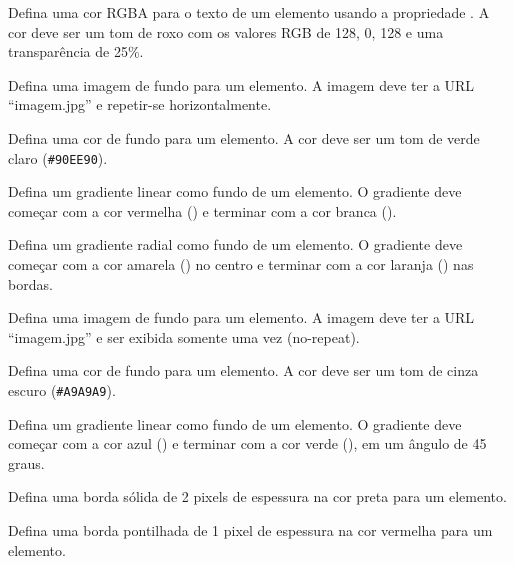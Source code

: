 \begin{exercise}
Defina uma cor RGBA para o texto de um elemento usando a propriedade . A cor deve ser um tom de roxo com os valores RGB de 128, 0, 128 e uma transparência de 25\%.
\end{exercise}

\begin{exercise}
Defina uma imagem de fundo para um elemento. A imagem deve ter a URL ``imagem.jpg'' e repetir-se horizontalmente.
\end{exercise}

\begin{exercise}
Defina uma cor de fundo para um elemento. A cor deve ser um tom de verde claro (\texttt{\#90EE90}).
\end{exercise}

\begin{exercise}
Defina um gradiente linear como fundo de um elemento. O gradiente deve começar com a cor vermelha () e terminar com a cor branca ().
\end{exercise}

\begin{exercise}
Defina um gradiente radial como fundo de um elemento. O gradiente deve começar com a cor amarela () no centro e terminar com a cor laranja () nas bordas.
\end{exercise}

\begin{exercise}
Defina uma imagem de fundo para um elemento. A imagem deve ter a URL ``imagem.jpg'' e ser exibida somente uma vez (no-repeat).
\end{exercise}

\begin{exercise}
Defina uma cor de fundo para um elemento. A cor deve ser um tom de cinza escuro (\texttt{\#A9A9A9}).
\end{exercise}

\begin{exercise}
Defina um gradiente linear como fundo de um elemento. O gradiente deve começar com a cor azul () e terminar com a cor verde (), em um ângulo de 45 graus.
\end{exercise}

\begin{exercise}
Defina uma borda sólida de 2 pixels de espessura na cor preta para um elemento.
\end{exercise}

\begin{exercise}
Defina uma borda pontilhada de 1 pixel de espessura na cor vermelha para um elemento.
\end{exercise}

